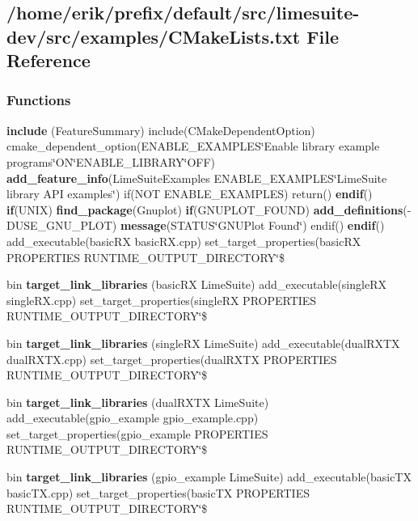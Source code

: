 \subsection{/home/erik/prefix/default/src/limesuite-\/dev/src/examples/\+C\+Make\+Lists.txt File Reference}
\label{src_2examples_2CMakeLists_8txt}
\subsubsection*{Functions}
\begin{DoxyCompactItemize}
\item 
{\bf include} (Feature\+Summary) include(C\+Make\+Dependent\+Option) cmake\+\_\+dependent\+\_\+option(E\+N\+A\+B\+L\+E\+\_\+\+E\+X\+A\+M\+P\+L\+ES\char`\"{}Enable library example programs\char`\"{}ON\char`\"{}E\+N\+A\+B\+L\+E\+\_\+\+L\+I\+B\+R\+A\+RY\char`\"{}O\+FF) {\bf add\+\_\+feature\+\_\+info}(Lime\+Suite\+Examples E\+N\+A\+B\+L\+E\+\_\+\+E\+X\+A\+M\+P\+L\+ES\char`\"{}Lime\+Suite library A\+PI examples\char`\"{}) if(N\+OT E\+N\+A\+B\+L\+E\+\_\+\+E\+X\+A\+M\+P\+L\+ES) return() {\bf endif}() {\bf if}(U\+N\+IX) {\bf find\+\_\+package}(Gnuplot) {\bf if}(G\+N\+U\+P\+L\+O\+T\+\_\+\+F\+O\+U\+ND) {\bf add\+\_\+definitions}(-\/D\+U\+S\+E\+\_\+\+G\+N\+U\+\_\+\+P\+L\+OT) {\bf message}(S\+T\+A\+T\+US\char`\"{}G\+N\+U\+Plot Found\char`\"{}) endif() {\bf endif}() add\+\_\+executable(basic\+RX basic\+R\+X.\+cpp) set\+\_\+target\+\_\+properties(basic\+RX P\+R\+O\+P\+E\+R\+T\+I\+ES R\+U\+N\+T\+I\+M\+E\+\_\+\+O\+U\+T\+P\+U\+T\+\_\+\+D\+I\+R\+E\+C\+T\+O\+RY\char`\"{}\$
\item 
bin {\bf target\+\_\+link\+\_\+libraries} (basic\+RX Lime\+Suite) add\+\_\+executable(single\+RX single\+R\+X.\+cpp) set\+\_\+target\+\_\+properties(single\+RX P\+R\+O\+P\+E\+R\+T\+I\+ES R\+U\+N\+T\+I\+M\+E\+\_\+\+O\+U\+T\+P\+U\+T\+\_\+\+D\+I\+R\+E\+C\+T\+O\+RY\char`\"{}\$
\item 
bin {\bf target\+\_\+link\+\_\+libraries} (single\+RX Lime\+Suite) add\+\_\+executable(dual\+R\+X\+TX dual\+R\+X\+T\+X.\+cpp) set\+\_\+target\+\_\+properties(dual\+R\+X\+TX P\+R\+O\+P\+E\+R\+T\+I\+ES R\+U\+N\+T\+I\+M\+E\+\_\+\+O\+U\+T\+P\+U\+T\+\_\+\+D\+I\+R\+E\+C\+T\+O\+RY\char`\"{}\$
\item 
bin {\bf target\+\_\+link\+\_\+libraries} (dual\+R\+X\+TX Lime\+Suite) add\+\_\+executable(gpio\+\_\+example gpio\+\_\+example.\+cpp) set\+\_\+target\+\_\+properties(gpio\+\_\+example P\+R\+O\+P\+E\+R\+T\+I\+ES R\+U\+N\+T\+I\+M\+E\+\_\+\+O\+U\+T\+P\+U\+T\+\_\+\+D\+I\+R\+E\+C\+T\+O\+RY\char`\"{}\$
\item 
bin {\bf target\+\_\+link\+\_\+libraries} (gpio\+\_\+example Lime\+Suite) add\+\_\+executable(basic\+TX basic\+T\+X.\+cpp) set\+\_\+target\+\_\+properties(basic\+TX P\+R\+O\+P\+E\+R\+T\+I\+ES R\+U\+N\+T\+I\+M\+E\+\_\+\+O\+U\+T\+P\+U\+T\+\_\+\+D\+I\+R\+E\+C\+T\+O\+RY\char`\"{}\$
\end{DoxyCompactItemize}


